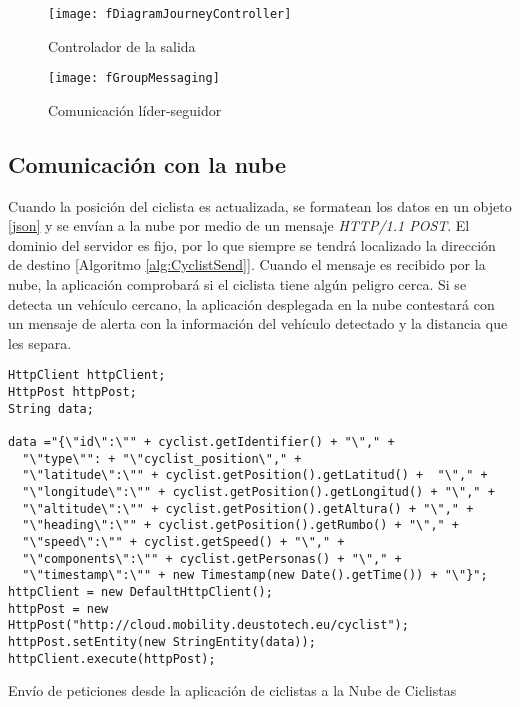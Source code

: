 \begin{figure}[H]
	\begin{center}
		\texttt{[image: fDiagramJourneyController]}
		\caption{Controlador de la salida}
		\label{figure:DiagramController}
	\end{center}
\end{figure}

\begin{figure}[H]
	\begin{center}
		\texttt{[image: fGroupMessaging]}
		\caption{Comunicación líder-seguidor}
		\label{figure:groupComm}
	\end{center}
\end{figure}

\subsection{Comunicación con la nube}\label{ssection:comunicacion_nube}
Cuando la posición del ciclista es actualizada, se formatean los datos en un objeto
\ref{json} y se envían a la nube por medio de un mensaje \emph{HTTP/1.1 POST}. El
dominio del servidor es fijo, por lo que siempre se tendrá localizado la dirección
de destino [Algoritmo \ref{alg:CyclistSend}]. Cuando el mensaje es recibido por
la nube, la aplicación comprobará si el ciclista tiene algún peligro cerca. Si
se detecta un vehículo cercano, la aplicación desplegada en la nube contestará con
un mensaje de alerta con la información del vehículo detectado y la distancia
que les separa.

\begin{listing}
	\begin{minipage}{.4\textwidth}
		\begin{verbatim}
HttpClient httpClient;
HttpPost httpPost;
String data;

data ="{\"id\":\"" + cyclist.getIdentifier() + "\"," +
  "\"type\"": + "\"cyclist_position\"," +
  "\"latitude\":\"" + cyclist.getPosition().getLatitud() +  "\"," +
  "\"longitude\":\"" + cyclist.getPosition().getLongitud() + "\"," +
  "\"altitude\":\"" + cyclist.getPosition().getAltura() + "\"," +
  "\"heading\":\"" + cyclist.getPosition().getRumbo() + "\"," +
  "\"speed\":\"" + cyclist.getSpeed() + "\"," +
  "\"components\":\"" + cyclist.getPersonas() + "\"," +
  "\"timestamp\":\"" + new Timestamp(new Date().getTime()) + "\"}";
httpClient = new DefaultHttpClient();
httpPost = new HttpPost("http://cloud.mobility.deustotech.eu/cyclist");
httpPost.setEntity(new StringEntity(data));
httpClient.execute(httpPost);
		\end{verbatim}
	\end{minipage}
	\caption{Envío de peticiones desde la aplicación de ciclistas a la Nube de
	Ciclistas}\label{alg:CyclistSend}
\end{listing}

